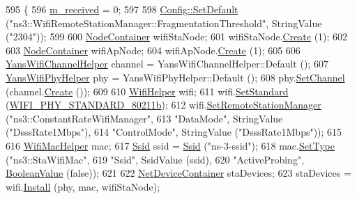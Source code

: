 \begin{DoxyCode}
595 \{
596   \hyperlink{classBug730TestCase_adcd611e94c2c190d0195a229f0331c71}{m\_received} = 0;
597 
598   \hyperlink{group__config_ga2e7882df849d8ba4aaad31c934c40c06}{Config::SetDefault} (\textcolor{stringliteral}{"ns3::WifiRemoteStationManager::FragmentationThreshold"}, 
      StringValue (\textcolor{stringliteral}{"2304"}));
599 
600   \hyperlink{classns3_1_1NodeContainer}{NodeContainer} wifiStaNode;
601   wifiStaNode.\hyperlink{classns3_1_1NodeContainer_a787f059e2813e8b951cc6914d11dfe69}{Create} (1);
602 
603   \hyperlink{classns3_1_1NodeContainer}{NodeContainer} wifiApNode;
604   wifiApNode.\hyperlink{classns3_1_1NodeContainer_a787f059e2813e8b951cc6914d11dfe69}{Create} (1);
605 
606   \hyperlink{classns3_1_1YansWifiChannelHelper}{YansWifiChannelHelper} channel = YansWifiChannelHelper::Default ();
607   \hyperlink{classns3_1_1YansWifiPhyHelper}{YansWifiPhyHelper} phy = YansWifiPhyHelper::Default ();
608   phy.\hyperlink{classns3_1_1YansWifiPhyHelper_ad2e9a27587dd4ff320435c93cc2676de}{SetChannel} (channel.\hyperlink{classns3_1_1YansWifiChannelHelper_a0532e292ab9452f3cf630c848708e563}{Create} ());
609 
610   \hyperlink{classns3_1_1WifiHelper}{WifiHelper} wifi;
611   wifi.\hyperlink{classns3_1_1WifiHelper_aa54f3e61527ef8de318d310045bc5dfd}{SetStandard} (\hyperlink{group__wifi_gga1299834f4e1c615af3ca738033b76a49a77e1cc9f77a0bce8e2bc82cbef437b5a}{WIFI\_PHY\_STANDARD\_80211b});
612   wifi.\hyperlink{classns3_1_1WifiHelper_a3d01b178aeb2de246ab5a3aa5638ce24}{SetRemoteStationManager} (\textcolor{stringliteral}{"ns3::ConstantRateWifiManager"},
613                                 \textcolor{stringliteral}{"DataMode"}, StringValue (\textcolor{stringliteral}{"DsssRate1Mbps"}),
614                                 \textcolor{stringliteral}{"ControlMode"}, StringValue (\textcolor{stringliteral}{"DsssRate1Mbps"}));
615 
616   \hyperlink{classns3_1_1WifiMacHelper}{WifiMacHelper} mac;
617   \hyperlink{classns3_1_1Ssid}{Ssid} ssid = \hyperlink{classns3_1_1Ssid}{Ssid} (\textcolor{stringliteral}{"ns-3-ssid"});
618   mac.\hyperlink{classns3_1_1WifiMacHelper_a382d8df76a1dd7007179d1963b4b6bc6}{SetType} (\textcolor{stringliteral}{"ns3::StaWifiMac"},
619                \textcolor{stringliteral}{"Ssid"}, SsidValue (ssid),
620                \textcolor{stringliteral}{"ActiveProbing"}, \hyperlink{classns3_1_1BooleanValue}{BooleanValue} (\textcolor{keyword}{false}));
621 
622   \hyperlink{classns3_1_1NetDeviceContainer}{NetDeviceContainer} staDevices;
623   staDevices = wifi.\hyperlink{classns3_1_1WifiHelper_a451b3d33fa1497c22f06c5451f57a127}{Install} (phy, mac, wifiStaNode);

\end{DoxyCode}
